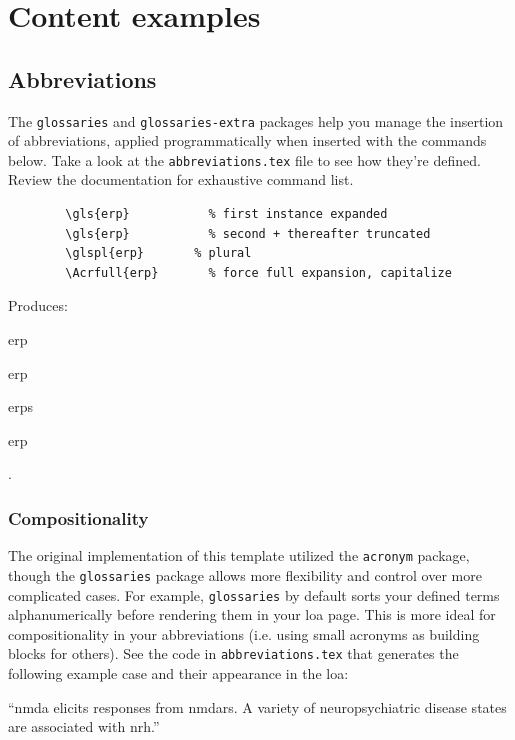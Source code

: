 \documentclass[../../main.tex]{subfiles}  %
\begin{document}
\section{Content examples}

	\subsection{Abbreviations}\label{sec:abbrevs}

	The \texttt{glossaries} and \texttt{glossaries-extra} packages help you manage the insertion of abbreviations, applied programmatically when inserted with the commands below. 
	Take a look at the \texttt{abbreviations.tex} file to see how they're defined.
	Review the documentation for exhaustive command list.
	
	\begin{verbatim}
		\gls{erp}		    % first instance expanded
		\gls{erp}		    % second + thereafter truncated
		\glspl{erp}		  % plural
		\Acrfull{erp}		% force full expansion, capitalize
	\end{verbatim}
	\nointerlineskip

	Produces: 
	\begin{enumerate*}[label=(\roman*), itemjoin={{, }}, itemjoin={{, }}, itemjoin*={{, and }}]
	\item \gls{erp}
	\item \gls{erp}
	\item \glspl{erp}
	\item \Acrfull{erp}
	\end{enumerate*}.

	\subsubsection{Compositionality}

	The original implementation of this template utilized the \texttt{acronym} package, though the \texttt{glossaries} package allows more flexibility and control over more complicated cases.
	For example, \texttt{glossaries} by default sorts your defined terms alphanumerically before rendering them in your \gls{loa} page. 
	This is more ideal for compositionality in your abbreviations (i.e. using small acronyms as building blocks for others). 
	See the code in \texttt{abbreviations.tex} that generates the following example case and their appearance in the \gls{loa}: 
	\begin{displayquote}  %
		``\gls{nmda} elicits responses from \glspl{nmdar}. 
		A variety of neuropsychiatric disease states are associated with \gls{nrh}.''	
	\end{displayquote}
\end{document}
